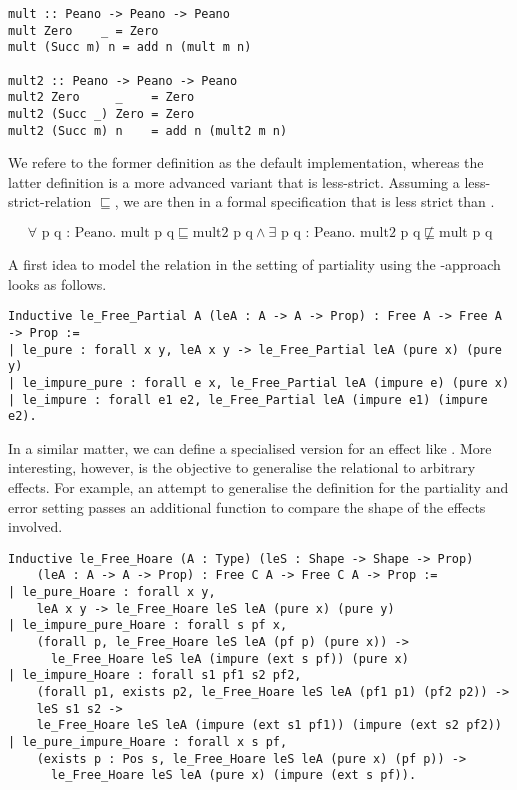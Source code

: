 {\begin{verbatim}
mult :: Peano -> Peano -> Peano
mult Zero    _ = Zero
mult (Succ m) n = add n (mult m n)

mult2 :: Peano -> Peano -> Peano
mult2 Zero     _    = Zero
mult2 (Succ _) Zero = Zero
mult2 (Succ m) n    = add n (mult2 m n)
\end{verbatim}

We refere to the former definition as the default implementation, whereas the latter definition is a more advanced variant that is less-strict.
Assuming a less-strict-relation $\sqsubseteq$, we are then  in a formal specification that  is less strict than .

\[
\forall \text{ p q : Peano}. \text{ mult p q} \sqsubseteq \text{mult2
  p q} \wedge \exists \text{ p q : Peano}. \text{ mult2 p q} \not \sqsubseteq \text{mult p q}
\]

A first idea to model the relation in the setting of partiality using the -approach looks as follows.

\begin{verbatim}
Inductive le_Free_Partial A (leA : A -> A -> Prop) : Free A -> Free A -> Prop :=
| le_pure : forall x y, leA x y -> le_Free_Partial leA (pure x) (pure y)
| le_impure_pure : forall e x, le_Free_Partial leA (impure e) (pure x)
| le_impure : forall e1 e2, le_Free_Partial leA (impure e1) (impure e2).
\end{verbatim}

In a similar matter, we can define a specialised version for an effect like .
More interesting, however, is the objective to generalise the relational to arbitrary effects.
For example, an attempt to generalise the definition for the partiality and error setting passes an additional function to compare the shape of the effects involved.

\begin{verbatim}
Inductive le_Free_Hoare (A : Type) (leS : Shape -> Shape -> Prop)
    (leA : A -> A -> Prop) : Free C A -> Free C A -> Prop :=
| le_pure_Hoare : forall x y,
    leA x y -> le_Free_Hoare leS leA (pure x) (pure y)
| le_impure_pure_Hoare : forall s pf x,
    (forall p, le_Free_Hoare leS leA (pf p) (pure x)) ->
      le_Free_Hoare leS leA (impure (ext s pf)) (pure x)
| le_impure_Hoare : forall s1 pf1 s2 pf2,
    (forall p1, exists p2, le_Free_Hoare leS leA (pf1 p1) (pf2 p2)) ->
    leS s1 s2 ->
    le_Free_Hoare leS leA (impure (ext s1 pf1)) (impure (ext s2 pf2))
| le_pure_impure_Hoare : forall x s pf,
    (exists p : Pos s, le_Free_Hoare leS leA (pure x) (pf p)) ->
      le_Free_Hoare leS leA (pure x) (impure (ext s pf)).
\end{verbatim}

}
